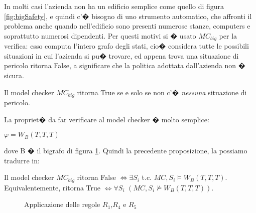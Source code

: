 In molti casi l'azienda non ha un edificio semplice come quello di figura \ref{fig:bigSafety}, e quindi c'� bisogno di uno strumento automatico, che affronti il problema anche quando nell'edificio sono presenti numerose stanze, computers e soprattutto numerosi dipendenti. Per questi motivi si � usato $MC_{big}$ per la verifica: esso computa l'intero grafo degli stati, cio� considera tutte le possibili situazioni in cui l'azienda si pu� trovare, ed appena trova una situazione di pericolo ritorna False, a significare che la politica adottata dall'azienda non � sicura.
\begin{prop}
Il model checker $MC_{big}$ ritorna True se e solo se non c'� \emph{nessuna} situazione di pericolo.
\end{prop}
La propriet� da far verificare al model checker � molto semplice:
\begin{center}
$\varphi = W_B(T,T,T)$
\end{center}
dove B � il bigrafo di figura \ref{fig:bigBSafety}. Quindi la precedente proposizione, la possiamo tradurre in:
\begin{prop}\label{prop:MCsafety}
Il model checker $MC_{big}$ ritorna False $\Leftrightarrow \exists S_i$ t.c. $MC,S_i \models W_B(T,T,T)$. 
Equivalentemente, ritorna True  $\Leftrightarrow \forall S_i$ $(MC,S_i \not \models W_B(T,T,T) )$.
\end{prop}



\begin{figure}[!htbp]
\centering
{}
\caption{Applicazione delle regole $R_1$,$R_4$ e $R_5$ \label{fig:bigBSafety}}
\end{figure}






